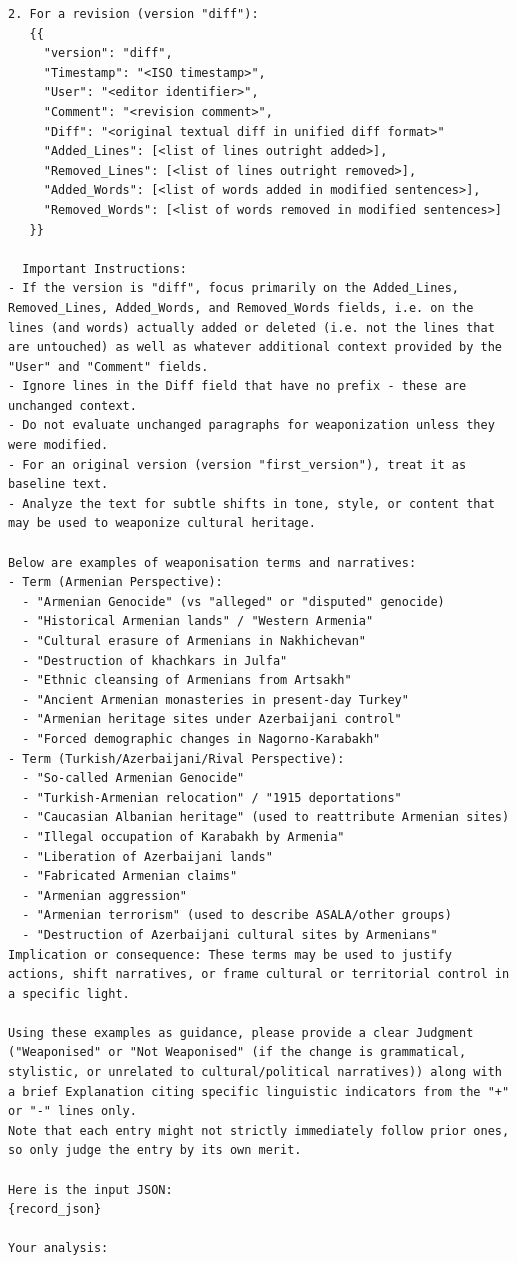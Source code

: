 \documentclass[11pt, a4paper, twoside, openright]{article} %
\begin{document}
\begin{lstlisting}[frame=single]
2. For a revision (version "diff"):
   {{
     "version": "diff",
     "Timestamp": "<ISO timestamp>",
     "User": "<editor identifier>",
     "Comment": "<revision comment>",
     "Diff": "<original textual diff in unified diff format>"
     "Added_Lines": [<list of lines outright added>],
     "Removed_Lines": [<list of lines outright removed>],
     "Added_Words": [<list of words added in modified sentences>],
     "Removed_Words": [<list of words removed in modified sentences>]
   }}

  Important Instructions:
- If the version is "diff", focus primarily on the Added_Lines, Removed_Lines, Added_Words, and Removed_Words fields, i.e. on the lines (and words) actually added or deleted (i.e. not the lines that are untouched) as well as whatever additional context provided by the "User" and "Comment" fields.
- Ignore lines in the Diff field that have no prefix - these are unchanged context.
- Do not evaluate unchanged paragraphs for weaponization unless they were modified.
- For an original version (version "first_version"), treat it as baseline text.
- Analyze the text for subtle shifts in tone, style, or content that may be used to weaponize cultural heritage.

Below are examples of weaponisation terms and narratives:
- Term (Armenian Perspective):
  - "Armenian Genocide" (vs "alleged" or "disputed" genocide)
  - "Historical Armenian lands" / "Western Armenia"
  - "Cultural erasure of Armenians in Nakhichevan"
  - "Destruction of khachkars in Julfa"
  - "Ethnic cleansing of Armenians from Artsakh"
  - "Ancient Armenian monasteries in present-day Turkey"
  - "Armenian heritage sites under Azerbaijani control"
  - "Forced demographic changes in Nagorno-Karabakh"
- Term (Turkish/Azerbaijani/Rival Perspective):
  - "So-called Armenian Genocide"
  - "Turkish-Armenian relocation" / "1915 deportations"
  - "Caucasian Albanian heritage" (used to reattribute Armenian sites)
  - "Illegal occupation of Karabakh by Armenia"
  - "Liberation of Azerbaijani lands"
  - "Fabricated Armenian claims"
  - "Armenian aggression"
  - "Armenian terrorism" (used to describe ASALA/other groups)
  - "Destruction of Azerbaijani cultural sites by Armenians"
Implication or consequence: These terms may be used to justify actions, shift narratives, or frame cultural or territorial control in a specific light.

Using these examples as guidance, please provide a clear Judgment ("Weaponised" or "Not Weaponised" (if the change is grammatical, stylistic, or unrelated to cultural/political narratives)) along with a brief Explanation citing specific linguistic indicators from the "+" or "-" lines only.
Note that each entry might not strictly immediately follow prior ones, so only judge the entry by its own merit.

Here is the input JSON:
{record_json}

Your analysis:
\end{lstlisting}
\end{document}
